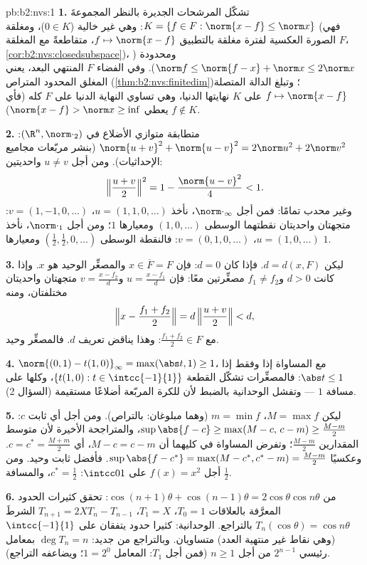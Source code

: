 \begin{solution}{pb:b2:nvs:1}
\textbf{1.} تشكّل المرشحات الجديرة بالنظر المجموعةَ $K = \{f \in F
: \norm{x - f} \leq \norm x\}$: وهي غير خالية ($0 \in K$)، ومغلقة
(فهي الصورة العكسية لفترة مغلقة بالتطبيق  $f \mapsto
\norm{x - f}$، متقاطعةً مع المغلقة $F$،
\cref{cor:b2:nvs:closedsubspace})، ومحدودة ($\norm f \leq
\norm{f - x} + \norm x \leq 2\norm x$). وفي الفضاء
$F$ المنتهي البعد، يعني المغلق المحدود المتراص
(\cref{thm:b2:nvs:finitedim})؛ وتبلغ الدالة المتصلة $f
\mapsto \norm{x - f}$ على $K$ نهايتها الدنيا، وهي تساوي
النهاية الدنيا على $F$ كله (فأي $f \notin K$ يعطي $\norm{x -
f} > \norm x \geq \inf$).

\textbf{2.} متطابقة متوازي الأضلاع في $(\R^n,
\norm\cdot_2)$: $\norm{u + v}^2 + \norm{u - v}^2 = 2\norm u^2 +
2\norm v^2$ (بنشر مربّعات مجاميع الإحداثيات). ومن أجل
$u \neq v$ واحديتين:
\[
\Bigl\Vert\frac{u+v}2\Bigr\Vert^2 = 1 - \frac{\norm{u -
v}^2}{4} < 1 .
\]
وغير محدب تمامًا: فمن أجل $\norm\cdot_\infty$، نأخذ $u = (1, 1, 0,
\dots)$، $v = (1, -1, 0, \dots)$: متجهتان واحديتان نقطتهما الوسطى
$(1, 0, \dots)$ ومعيارها $1$؛ ومن أجل $\norm\cdot_1$، نأخذ $u = (1,
0, \dots)$، $v = (0, 1, 0, \dots)$: فالنقطة الوسطى $(\frac12,
\frac12, 0, \dots)$ ومعيارها $1$.

\textbf{3.} ليكن $d = d(x, F)$. فإذا كان $d = 0$: فإن $x \in \overline F =
F$ والمصغِّر الوحيد هو $x$. وإذا كانت $d > 0$ و$f_1 \neq f_2$
مصغِّرتين معًا: فإن $u = \frac{x - f_1}{d}$ و$v = \frac{x -
f_2}{d}$ متجهتان واحديتان مختلفتان، ومنه
\[
\Bigl\Vert x - \frac{f_1 + f_2}2\Bigr\Vert
= d\,\Bigl\Vert\frac{u + v}2\Bigr\Vert < d ,
\]
مع $\frac{f_1 + f_2}2 \in F$: وهذا يناقض تعريف
$d$. فالمصغِّر وحيد.

\textbf{4.} $\norm{(0,1) - t(1,0)}_\infty = \max(\abs t, 1)
\geq 1$، مع المساواة إذا وفقط إذا $\abs t \leq 1$: فالمصغِّرات تشكّل
القطعة $\{t(1, 0) : t \in \intcc{-1}{1}\}$، وكلها على مسافة
$1$ --- وتفشل الوحدانية بالضبط لأن للكرة المربّعة
أضلاعًا مستقيمة (السؤال 2).

\textbf{5.} ليكن $M = \max f$، $m = \min f$ (وهما مبلوغان:
بالتراص). ومن أجل أي ثابت $c$: $\sup\abs{f - c} \geq
\max(M - c,\, c - m) \geq \frac{M - m}2$، والمتراجحة الأخيرة
لأن متوسط المقدارين $\frac{M-m}2$؛ وتفرض المساواة في
كليهما أن $M - c = c - m$، أي $c = c^* = \frac{M + m}2$.
وعكسيًا $\sup\abs{f - c^*} = \max(M - c^*, c^* - m) =
\frac{M - m}2$. فأفضل ثابت وحيد. ومن أجل $f(x) = x^2$ على
$\intcc01$: $c^* = \frac12$، والمسافة $\frac12$.

\textbf{6.} من $\cos(n{+}1)\theta + \cos(n{-}1)\theta =
2\cos\theta\cos n\theta$: تحقق كثيرات الحدود المعرَّفة بالعلاقات $T_0 = 1$،
$T_1 = X$، $T_{n+1} = 2XT_n - T_{n-1}$ الشرطَ $T_n(\cos\theta)
= \cos n\theta$ بالتراجع. الوحدانية: كثيرا حدود
يتفقان على $\intcc{-1}{1}$ (وهي نقاط غير منتهية العدد) متساويان.
وبالتراجع من جديد: $\deg T_n = n$ بمعامل رئيسي
$2^{n-1}$ من أجل $n \geq 1$ (فمن أجل $T_1$: المعامل $1 = 2^0$؛
ويضاعفه التراجع).


\end{solution}
